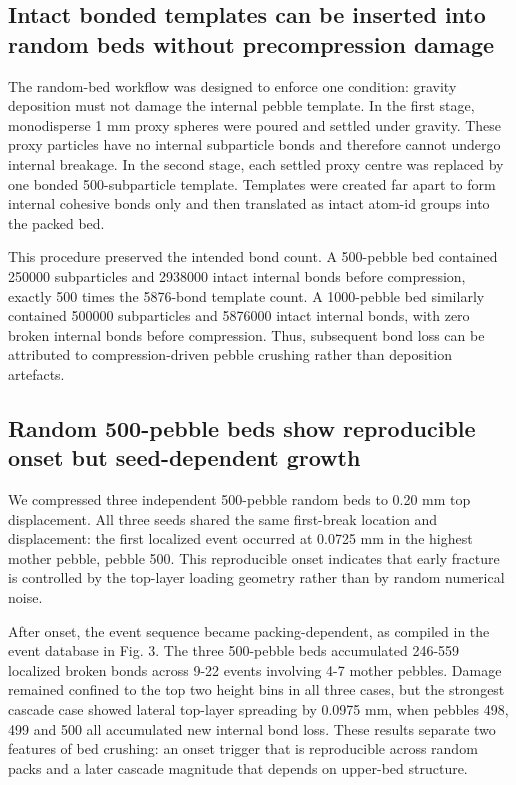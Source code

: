 \documentclass[10pt,twocolumn]{article}
\begin{document}
\subsection{Intact bonded templates can be inserted into random beds without precompression damage}

The random-bed workflow was designed to enforce one condition: gravity deposition must not damage the internal pebble template. In the first stage, monodisperse 1 mm proxy spheres were poured and settled under gravity. These proxy particles have no internal subparticle bonds and therefore cannot undergo internal breakage. In the second stage, each settled proxy centre was replaced by one bonded 500-subparticle template. Templates were created far apart to form internal cohesive bonds only and then translated as intact atom-id groups into the packed bed.


This procedure preserved the intended bond count. A 500-pebble bed contained 250000 subparticles and 2938000 intact internal bonds before compression, exactly 500 times the 5876-bond template count. A 1000-pebble bed similarly contained 500000 subparticles and 5876000 intact internal bonds, with zero broken internal bonds before compression. Thus, subsequent bond loss can be attributed to compression-driven pebble crushing rather than deposition artefacts.


\subsection{Random 500-pebble beds show reproducible onset but seed-dependent growth}

We compressed three independent 500-pebble random beds to 0.20 mm top displacement. All three seeds shared the same first-break location and displacement: the first localized event occurred at 0.0725 mm in the highest mother pebble, pebble 500. This reproducible onset indicates that early fracture is controlled by the top-layer loading geometry rather than by random numerical noise.


After onset, the event sequence became packing-dependent, as compiled in the event database in Fig. 3. The three 500-pebble beds accumulated 246-559 localized broken bonds across 9-22 events involving 4-7 mother pebbles. Damage remained confined to the top two height bins in all three cases, but the strongest cascade case showed lateral top-layer spreading by 0.0975 mm, when pebbles 498, 499 and 500 all accumulated new internal bond loss. These results separate two features of bed crushing: an onset trigger that is reproducible across random packs and a later cascade magnitude that depends on upper-bed structure.
\end{document}
